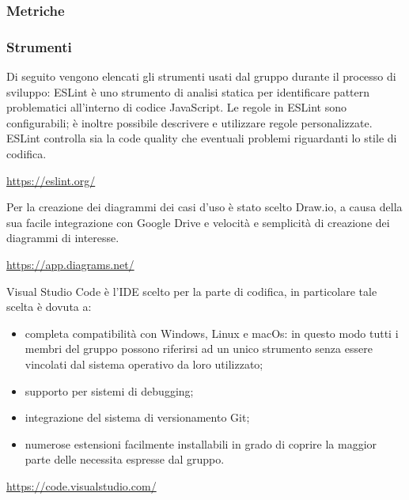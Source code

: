 	\subsubsection{Metriche} 
	
	\subsubsection{Strumenti}
	Di seguito vengono elencati gli strumenti usati dal gruppo durante il processo di sviluppo:
		ESLint è uno strumento di analisi statica per identificare pattern problematici all'interno di codice JavaScript. Le regole in ESLint sono configurabili; è inoltre possibile descrivere e utilizzare regole personalizzate. ESLint controlla sia la code quality che eventuali problemi riguardanti lo stile di codifica.
		\begin{center}
			\url{https://eslint.org/}
		\end{center}
		
		Per la creazione dei diagrammi dei casi d'uso è stato scelto Draw.io, a causa della sua facile integrazione con Google Drive e velocità e semplicità di creazione dei diagrammi di interesse.  
		\begin{center}
			\url{https://app.diagrams.net/}
		\end{center}
		
		Visual Studio Code è l'IDE scelto per la parte di codifica, in particolare tale scelta è dovuta a: 
		\begin{itemize}
			\item completa compatibilità con Windows, Linux e macOs: in questo modo tutti i membri del gruppo possono riferirsi ad un unico strumento senza essere vincolati dal sistema operativo da loro utilizzato; 
			\item supporto per sistemi di debugging; 
			\item integrazione del sistema di versionamento Git; 
			\item numerose estensioni facilmente installabili in grado di coprire la maggior parte delle necessita espresse dal gruppo. 
		\end{itemize} 
		\begin{center}
			\url{https://code.visualstudio.com/}
		\end{center}
	